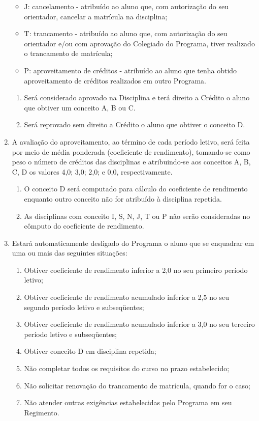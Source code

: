 \documentclass{article}
\begin{document}
\begin{enumerate}
\begin{itemize}
		\item J: cancelamento - atribuído ao aluno que, com autorização do seu orientador, cancelar a matrícula na disciplina;
		\item T: trancamento - atribuído ao aluno que, com autorização do seu orientador e/ou com aprovação do Colegiado do Programa, tiver realizado o trancamento de matrícula;
		\item P: aproveitamento de créditos - atribuído ao aluno que tenha obtido aproveitamento de créditos realizados em outro Programa.
	\end{itemize}
	\begin{enumerate}
		\item Será considerado aprovado na Disciplina e terá direito a Crédito o aluno que obtiver um conceito A, B ou C.
		\item Será reprovado sem direito a Crédito o aluno que obtiver o conceito D.
	\end{enumerate}

	\item A avaliação do aproveitamento, ao término de cada período letivo, será feita por meio de média ponderada (coeficiente de rendimento), tomando-se como peso o número de créditos das disciplinas e atribuindo-se aos conceitos A, B, C, D os valores 4,0; 3,0; 2,0; e 0,0, respectivamente.

	\begin{enumerate}
		\item O conceito D será computado para cálculo do coeficiente de rendimento enquanto outro conceito não for atribuído à disciplina repetida.
		\item As disciplinas com conceito I, S, N, J, T ou P não serão consideradas no cômputo do coeficiente de rendimento.
	\end{enumerate}

	\item Estará automaticamente desligado do Programa o aluno que se enquadrar em uma ou mais das seguintes situações:
	\begin{enumerate}[label=\Roman*]
		\item Obtiver coeficiente de rendimento inferior a 2,0 no seu primeiro período letivo;
		\item Obtiver coeficiente de rendimento acumulado inferior a 2,5 no seu segundo período letivo e subseqüentes;
		\item Obtiver coeficiente de rendimento acumulado inferior a 3,0 no seu terceiro período letivo e subseqüentes;
		\item Obtiver conceito D em disciplina repetida;
		\item Não completar todos os requisitos do curso no prazo estabelecido;
		\item Não solicitar renovação do trancamento de matrícula, quando for o caso;
		\item Não atender outras exigências estabelecidas pelo Programa em seu Regimento.
	\end{enumerate}


\end{enumerate}
\end{document}
